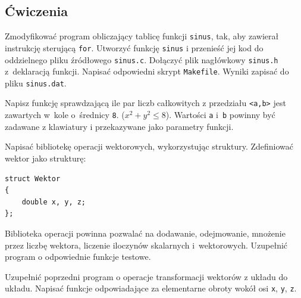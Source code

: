\subsection{Ćwiczenia}



\begin{myenumerate}
\item Zmodyfikować program obliczający tablicę funkcji \lstinline[style=MyBashStyle]{sinus}, tak, aby zawierał instrukcję sterującą \lstinline[style=MyBashStyle]{for}. Utworzyć funkcję \lstinline[style=MyBashStyle]{sinus} i przenieść jej kod do oddzielnego pliku źródłowego \lstinline[style=MyBashStyle]{sinus.c}. Dołączyć plik nagłówkowy \lstinline[style=MyBashStyle]{sinus.h} z~deklaracją funkcji. Napisać odpowiedni skrypt \lstinline[style=MyBashStyle]{Makefile}. Wyniki zapisać do pliku \lstinline[style=MyBashStyle]{sinus.dat}.
\item Napisz funkcję sprawdzającą ile par liczb całkowitych z przedziału \lstinline[style=MyBashStyle]{<a,b>} jest zawartych w~kole o~średnicy \lstinline[style=MyBashStyle]{8}. ($x^2+y^2\leq 8$). Wartości \lstinline[style=MyBashStyle]{a} i~\lstinline[style=MyBashStyle]{b} powinny być zadawane z klawiatury i przekazywane jako parametry funkcji.
\item Napisać bibliotekę operacji wektorowych, wykorzystując struktury. Zdefiniować wektor jako strukturę:

\begin{lstlisting}[style=MyCStyle]
struct Wektor
{
	double x, y, z;
};
\end{lstlisting}

Biblioteka operacji powinna pozwalać na dodawanie, odejmowanie, mnożenie przez liczbę wektora, liczenie iloczynów skalarnych i~wektorowych. Uzupełnić program  o odpowiednie funkcje testowe.
\item Uzupełnić poprzedni program o operacje transformacji wektorów z układu do układu. Napisać funkcje odpowiadające za elementarne obroty wokół osi \lstinline[style=MyBashStyle]{x}, \lstinline[style=MyBashStyle]{y}, \lstinline[style=MyBashStyle]{z}.
\end{myenumerate}




\cleardoublepage
